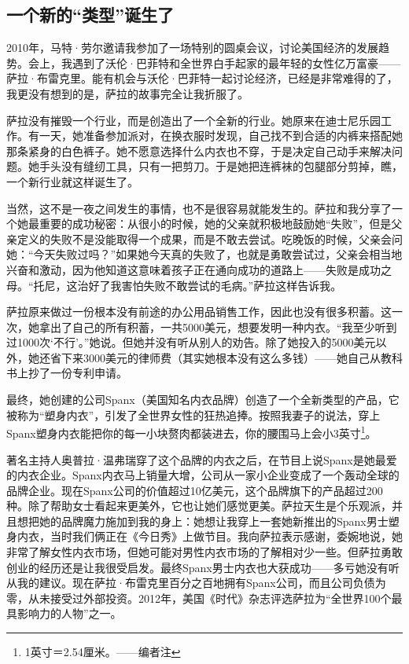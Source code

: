 \subsection{一个新的“类型”诞生了}

2010年，马特·劳尔邀请我参加了一场特别的圆桌会议，讨论美国经济的发展趋势。会上，我遇到了沃伦·巴菲特和全世界白手起家的最年轻的女性亿万富豪——萨拉·布雷克里。能有机会与沃伦·巴菲特一起讨论经济，已经是非常难得的了，我更没有想到的是，萨拉的故事完全让我折服了。

萨拉没有摧毁一个行业，而是创造出了一个全新的行业。她原来在迪士尼乐园工作。有一天，她准备参加派对，在换衣服时发现，自己找不到合适的内裤来搭配她那条紧身的白色裤子。她不愿意选择什么内衣也不穿，于是决定自己动手来解决问题。她手头没有缝纫工具，只有一把剪刀。于是她把连裤袜的包腿部分剪掉，瞧，一个新行业就这样诞生了。

当然，这不是一夜之间发生的事情，也不是很容易就能发生的。萨拉和我分享了一个她最重要的成功秘密：从很小的时候，她的父亲就积极地鼓励她“失败”，但是父亲定义的失败不是没能取得一个成果，而是不敢去尝试。吃晚饭的时候，父亲会问她：“今天失败过吗？”如果她今天真的失败了，也就是勇敢尝试过，父亲会相当地兴奋和激动，因为他知道这意味着孩子正在通向成功的道路上——失败是成功之母。“托尼，这治好了我害怕失败不敢尝试的毛病。”萨拉这样告诉我。

萨拉原来做过一份根本没有前途的办公用品销售工作，因此也没有很多积蓄。这一次，她拿出了自己的所有积蓄，一共5000美元，想要发明一种内衣。“我至少听到过1000次‘不行’。”她说。但她并没有听从别人的劝告。除了她投入的5000美元以外，她还省下来3000美元的律师费（其实她根本没有这么多钱）——她自己从教科书上抄了一份专利申请。

最终，她创建的公司Spanx（美国知名内衣品牌）创造了一个全新类型的产品，它被称为“塑身内衣”，引发了全世界女性的狂热追捧。按照我妻子的说法，穿上Spanx塑身内衣能把你的每一小块赘肉都装进去，你的腰围马上会小3英寸\footnote{\label{fn:pdf-18-1}1英寸＝2.54厘米。——编者注}。

著名主持人奥普拉·温弗瑞穿了这个品牌的内衣之后，在节目上说Spanx是她最爱的内衣企业。Spanx内衣马上销量大增，公司从一家小企业变成了一个轰动全球的品牌企业。现在Spanx公司的价值超过10亿美元，这个品牌旗下的产品超过200种。除了帮助女士看起来更美外，它也让她们感觉更美。萨拉天生是个乐观派，并且想把她的品牌魔力施加到我的身上：她想让我穿上一套她新推出的Spanx男士塑身内衣，当时我们俩正在《今日秀》上做节目。我向萨拉表示感谢，委婉地说，她非常了解女性内衣市场，但她可能对男性内衣市场的了解相对少一些。但萨拉勇敢创业的经历还是让我很受启发。最终Spanx男士内衣也大获成功——多亏她没有听从我的建议。现在萨拉·布雷克里百分之百地拥有Spanx公司，而且公司负债为零，从未接受过外部投资。2012年，美国《时代》杂志评选萨拉为“全世界100个最具影响力的人物”之一。

